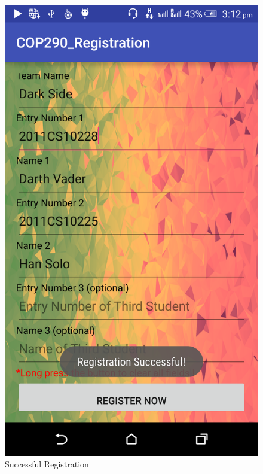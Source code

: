 \documentclass[12pt]{article}
\begin{document}
\begin{figure}[!htb]
  \centering
  \begin{minipage}[b]{0.4\textwidth}
    \includegraphics[width=\textwidth]{images/success.png}
    \caption{Successful Registration}
  \end{minipage}
  \hfill
  \begin{minipage}[b]{0.4\textwidth}

\end{minipage}
\end{figure}
\end{document}
